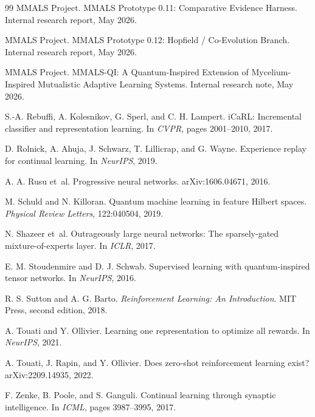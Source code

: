 \documentclass[10pt]{article}
\begin{document}
\begin{thebibliography}{99}
MMALS Project.
\newblock MMALS Prototype 0.11: Comparative Evidence Harness.
\newblock Internal research report, May 2026.

MMALS Project.
\newblock MMALS Prototype 0.12: Hopfield / Co-Evolution Branch.
\newblock Internal research report, May 2026.

MMALS Project.
\newblock MMALS-QI: A Quantum-Inspired Extension of Mycelium-Inspired Mutualistic Adaptive Learning Systems.
\newblock Internal research note, May 2026.

S.-A. Rebuffi, A. Kolesnikov, G. Sperl, and C. H. Lampert.
\newblock iCaRL: Incremental classifier and representation learning.
\newblock In \emph{CVPR}, pages 2001--2010, 2017.

D. Rolnick, A. Ahuja, J. Schwarz, T. Lillicrap, and G. Wayne.
\newblock Experience replay for continual learning.
\newblock In \emph{NeurIPS}, 2019.

A. A. Rusu et~al.
\newblock Progressive neural networks.
\newblock arXiv:1606.04671, 2016.

M. Schuld and N. Killoran.
\newblock Quantum machine learning in feature Hilbert spaces.
\newblock \emph{Physical Review Letters}, 122:040504, 2019.

N. Shazeer et~al.
\newblock Outrageously large neural networks: The sparsely-gated mixture-of-experts layer.
\newblock In \emph{ICLR}, 2017.

E. M. Stoudenmire and D. J. Schwab.
\newblock Supervised learning with quantum-inspired tensor networks.
\newblock In \emph{NeurIPS}, 2016.

R. S. Sutton and A. G. Barto.
\newblock \emph{Reinforcement Learning: An Introduction}.
\newblock MIT Press, second edition, 2018.

A. Touati and Y. Ollivier.
\newblock Learning one representation to optimize all rewards.
\newblock In \emph{NeurIPS}, 2021.

A. Touati, J. Rapin, and Y. Ollivier.
\newblock Does zero-shot reinforcement learning exist?
\newblock arXiv:2209.14935, 2022.

F. Zenke, B. Poole, and S. Ganguli.
\newblock Continual learning through synaptic intelligence.
\newblock In \emph{ICML}, pages 3987--3995, 2017.

\end{thebibliography}
\end{document}
